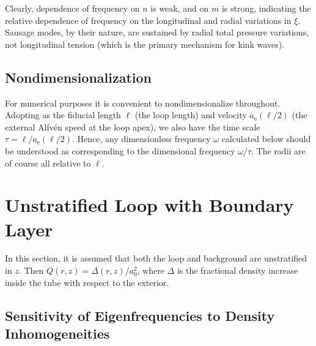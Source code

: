 \documentclass[12pt]{iopart}
\renewcommand{\L}{{\ell}}
\begin{document}


Clearly, dependence of frequency on $n$ is weak, and on $m$ is strong, indicating the relative dependence of frequency on the longitudinal and radial variations in $\xi$. Sausage modes, by their nature, are sustained by radial total pressure variations, not longitudinal tension (which is the primary mechanism for kink waves). 


\subsection{Nondimensionalization}
For numerical purposes it is convenient to nondimensionalize throughout. Adopting as the fiducial length $\L$ (the loop length) and velocity $a_\text{e}(\L/2)$ (the external Alfv\'en speed at the loop apex), we also have the time scale $\tau=\L/a_\text{e}(\L/2)$. Hence, any dimensionless frequency $\omega$ calculated below should be understood as corresponding to the dimensional frequency $\omega/\tau$. The radii are of course all relative to $\L$.



\section{Unstratified Loop with Boundary Layer}
In this section, it is assumed that both the loop and background are unstratified in $z$. Then  $Q(r,z)=\Delta(r,z)/a_0^2$, where $\Delta$ is the fractional density increase inside the tube with respect to the exterior.

\subsection{Sensitivity of Eigenfrequencies to Density Inhomogeneities}
\end{document}
